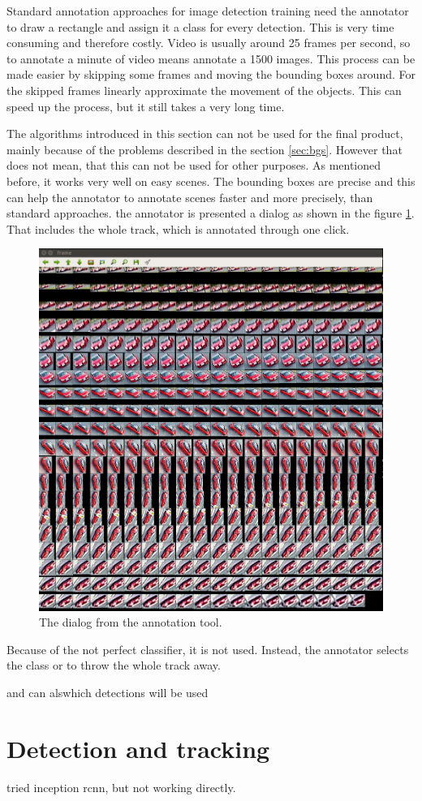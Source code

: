 \documentclass[a4paper,12pt,titlepage, twoside]{article}
\numberwithin{figure}{section}
\begin{document}
Standard annotation approaches for image detection training need the annotator to draw a rectangle and assign it a class for every detection. This is very time consuming and therefore costly. Video is usually around 25 frames per second, so to annotate a minute of video means annotate a 1500 images. This process can be made easier by skipping some frames and moving the bounding boxes around. For the skipped frames linearly approximate the movement of the objects. This can speed up the process, but it still takes a very long time. 


The algorithms introduced in this section can not be used for the final product, mainly because of the problems described in the section \ref{sec:bgs}. However that does not mean, that this can not be used for other purposes. As mentioned before, it works very well on easy scenes. The bounding boxes are precise and this can help the annotator to annotate scenes faster and more precisely, than standard approaches. the annotator is presented a dialog as shown in the figure \ref{fig:labeling}. That includes the whole track, which is annotated through one click. 


\begin{figure}[h!]
\centering
\includegraphics[width=0.5\linewidth]{fig/omni_labeling.png}
\caption{The dialog from the annotation tool.}
\label{fig:labeling}
\end{figure}


Because of the not perfect classifier, it is not used. Instead, the annotator selects the class or to throw the whole track away.


and can alswhich detections will be used



\section{Detection and tracking}
tried inception rcnn, but not working directly.
\end{document}
